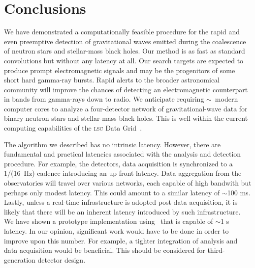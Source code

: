 \section{Conclusions}
\label{SECV}\label{sec:conclusions}

%
We have demonstrated a computationally feasible procedure for the rapid and even preemptive
detection of gravitational waves emitted during the coalescence of neutron
stars and stellar-mass black holes. Our method is as fast as standard \fft{}
convolutions but without any latency at all. Our search targets are expected to
produce prompt electromagnetic signals and may be the progenitors of some short
hard gamma-ray bursts.  Rapid alerts to the broader astronomical community will
improve the chances of detecting an electromagnetic counterpart in bands from
gamma-rays down to radio.  We anticipate requiring $\sim$\numcpus\ modern
%
%
%
computer cores to analyze a four-detector network of gravitational-wave data
for binary neutron stars and stellar-mass black holes.  This is well within the
current computing capabilities of the \textsc{lsc} Data Grid~\cite{LDG}.

The algorithm we described has no intrinsic latency.  However, there are
fundamental and practical latencies associated with the analysis and detection
procedure. For example, the \LIGO{} detectors, data acquisition is synchronized
to a 1/(16~Hz) cadence introducing an up-front latency.  Data
aggregation from the observatories will travel over various networks, each
capable of high bandwith but perhaps only modest latency.  This could amount to
a similar latency of $\sim$100 ms.  Lastly, unless a real-time infrastructure is
adopted post data acquisition, it is likely that there will be an inherent
latency introduced by such infrastructure.  We have shown a prototype
implementation using \gstlal\ that is capable of $\sim$1 s latency. In our
opinion, significant work would have to be done in order to improve upon this
number. For example, a tighter integration of analysis and data acquisition
would be beneficial. This should be considered for third-generation detector
design.


